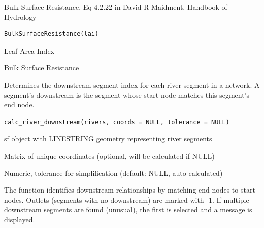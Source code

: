 \documentclass[a4paper]{book}
\begin{document}
%
\begin{Description}\relax
Bulk Surface Resistance, Eq 4.2.22 in David R Maidment, Handbook of Hydrology
\end{Description}
%
\begin{Usage}
\begin{verbatim}
BulkSurfaceResistance(lai)
\end{verbatim}
\end{Usage}
%
\begin{Arguments}
\begin{ldescription}
\item[\code{lai}] Leaf Area Index 
\end{ldescription}
\end{Arguments}
%
\begin{Value}
Bulk Surface Resistance 
\end{Value}
%
\begin{Description}\relax
Determines the downstream segment index for each river segment in a network.
A segment's downstream is the segment whose start node matches this segment's
end node.
\end{Description}
%
\begin{Usage}
\begin{verbatim}
calc_river_downstream(rivers, coords = NULL, tolerance = NULL)
\end{verbatim}
\end{Usage}
%
\begin{Arguments}
\begin{ldescription}
\item[\code{rivers}] sf object with LINESTRING geometry representing river segments

\item[\code{coords}] Matrix of unique coordinates (optional, will be calculated if NULL)

\item[\code{tolerance}] Numeric, tolerance for simplification (default: NULL, auto-calculated)
\end{ldescription}
\end{Arguments}
%
\begin{Details}\relax
The function identifies downstream relationships by matching end nodes to
start nodes. Outlets (segments with no downstream) are marked with -1.
If multiple downstream segments are found (unusual), the first is selected
and a message is displayed.
\end{Details}
\end{document}
